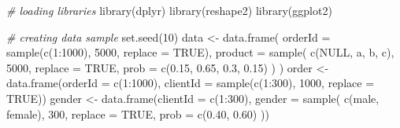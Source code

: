 \documentclass[
]{book}
\newenvironment{Shaded}{\begin{snugshade}}{\end{snugshade}}
\newcommand{\AttributeTok}[1]{\textcolor[rgb]{0.77,0.63,0.00}{#1}}
\newcommand{\CommentTok}[1]{\textcolor[rgb]{0.56,0.35,0.01}{\textit{#1}}}
\newcommand{\ConstantTok}[1]{\textcolor[rgb]{0.00,0.00,0.00}{#1}}
\newcommand{\DecValTok}[1]{\textcolor[rgb]{0.00,0.00,0.81}{#1}}
\newcommand{\FloatTok}[1]{\textcolor[rgb]{0.00,0.00,0.81}{#1}}
\newcommand{\FunctionTok}[1]{\textcolor[rgb]{0.00,0.00,0.00}{#1}}
\newcommand{\NormalTok}[1]{#1}
\newcommand{\OtherTok}[1]{\textcolor[rgb]{0.56,0.35,0.01}{#1}}
\newcommand{\SpecialCharTok}[1]{\textcolor[rgb]{0.00,0.00,0.00}{#1}}
\newcommand{\StringTok}[1]{\textcolor[rgb]{0.31,0.60,0.02}{#1}}
\begin{document}
\begin{Shaded}
\begin{Highlighting}[]
\CommentTok{\# loading libraries}
\FunctionTok{library}\NormalTok{(dplyr)}
\FunctionTok{library}\NormalTok{(reshape2)}
\FunctionTok{library}\NormalTok{(ggplot2)}
 
\CommentTok{\# creating data sample}
\FunctionTok{set.seed}\NormalTok{(}\DecValTok{10}\NormalTok{)}
\NormalTok{data }\OtherTok{\textless{}{-}} \FunctionTok{data.frame}\NormalTok{(}
    \AttributeTok{orderId =} \FunctionTok{sample}\NormalTok{(}\FunctionTok{c}\NormalTok{(}\DecValTok{1}\SpecialCharTok{:}\DecValTok{1000}\NormalTok{), }\DecValTok{5000}\NormalTok{, }\AttributeTok{replace =} \ConstantTok{TRUE}\NormalTok{),}
    \AttributeTok{product =} \FunctionTok{sample}\NormalTok{(}
        \FunctionTok{c}\NormalTok{(}\StringTok{\textquotesingle{}NULL\textquotesingle{}}\NormalTok{, }\StringTok{\textquotesingle{}a\textquotesingle{}}\NormalTok{, }\StringTok{\textquotesingle{}b\textquotesingle{}}\NormalTok{, }\StringTok{\textquotesingle{}c\textquotesingle{}}\NormalTok{),}
        \DecValTok{5000}\NormalTok{,}
        \AttributeTok{replace =} \ConstantTok{TRUE}\NormalTok{,}
        \AttributeTok{prob =} \FunctionTok{c}\NormalTok{(}\FloatTok{0.15}\NormalTok{, }\FloatTok{0.65}\NormalTok{, }\FloatTok{0.3}\NormalTok{, }\FloatTok{0.15}\NormalTok{)}
\NormalTok{    )}
\NormalTok{)}
\NormalTok{order }\OtherTok{\textless{}{-}} \FunctionTok{data.frame}\NormalTok{(}\AttributeTok{orderId =} \FunctionTok{c}\NormalTok{(}\DecValTok{1}\SpecialCharTok{:}\DecValTok{1000}\NormalTok{),}
                    \AttributeTok{clientId =} \FunctionTok{sample}\NormalTok{(}\FunctionTok{c}\NormalTok{(}\DecValTok{1}\SpecialCharTok{:}\DecValTok{300}\NormalTok{), }\DecValTok{1000}\NormalTok{, }\AttributeTok{replace =} \ConstantTok{TRUE}\NormalTok{))}
\NormalTok{gender }\OtherTok{\textless{}{-}} \FunctionTok{data.frame}\NormalTok{(}\AttributeTok{clientId =} \FunctionTok{c}\NormalTok{(}\DecValTok{1}\SpecialCharTok{:}\DecValTok{300}\NormalTok{),}
                     \AttributeTok{gender =} \FunctionTok{sample}\NormalTok{(}
                         \FunctionTok{c}\NormalTok{(}\StringTok{\textquotesingle{}male\textquotesingle{}}\NormalTok{, }\StringTok{\textquotesingle{}female\textquotesingle{}}\NormalTok{),}
                         \DecValTok{300}\NormalTok{,}
                         \AttributeTok{replace =} \ConstantTok{TRUE}\NormalTok{,}
                         \AttributeTok{prob =} \FunctionTok{c}\NormalTok{(}\FloatTok{0.40}\NormalTok{, }\FloatTok{0.60}\NormalTok{)}
\NormalTok{                     ))}

\end{Highlighting}
\end{Shaded}
\end{document}
